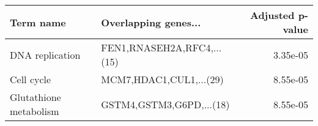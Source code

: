 \begin{tabular}{llr}
\toprule
             Term name &       Overlapping genes... &  Adjusted p-value \\
\midrule
       DNA replication & FEN1,RNASEH2A,RFC4,...(15) &          3.35e-05 \\
            Cell cycle &    MCM7,HDAC1,CUL1,...(29) &          8.55e-05 \\
Glutathione metabolism &   GSTM4,GSTM3,G6PD,...(18) &          8.55e-05 \\
\bottomrule
\end{tabular}
